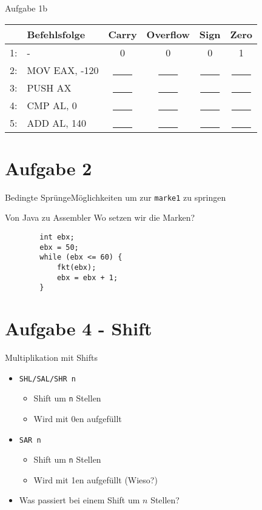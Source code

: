 \documentclass[
  german,            %
  aspectratio=169,    %
  sectionpage=false,   %
]{tumbeamer}
\begin{document}
\begin{frame}{Aufgabe 1b}
		\begin{center}
	\begin{tabular}{r l c c c c}
		& Befehlsfolge & Carry & Overflow & Sign & Zero\\ \hline
		1: & - & 0 & 0 & 0 & 1\\
		2: & MOV EAX, -120 & \underline{~~~~} & \underline{~~~~} & \underline{~~~~} & \underline{~~~~}\\
		3: & PUSH AX & \underline{~~~~} & \underline{~~~~} & \underline{~~~~} & \underline{~~~~}\\
		4: & CMP AL, 0 & \underline{~~~~} & \underline{~~~~} & \underline{~~~~} & \underline{~~~~}\\
		5: & ADD AL, 140 & \underline{~~~~} & \underline{~~~~} & \underline{~~~~} & \underline{~~~~}
	\end{tabular}
\end{center}
\end{frame}
\section{Aufgabe 2}
\begin{frame}{Bedingte Sprünge}{Möglichkeiten um zur \texttt{marke1} zu springen}
\end{frame}
\begin{frame}[fragile]{Von Java zu Assembler}
Wo setzen wir die Marken?
\newline
	\lstset{language=C}
	\begin{lstlisting}
		int ebx;
		ebx = 50;
		while (ebx <= 60) {
			fkt(ebx);
			ebx = ebx + 1;
		}
	\end{lstlisting}
\end{frame}
\section{Aufgabe 4 - Shift}
\begin{frame}{Multiplikation mit Shifts}
	\begin{itemize}
		\item \texttt{SHL/SAL/SHR n}
		\begin{itemize}
			\item Shift um \texttt{n} Stellen
			\item Wird mit 0en aufgefüllt
		\end{itemize}
		\item \texttt{SAR n}
		\begin{itemize}
			\item Shift um \texttt{n} Stellen
			\item Wird mit 1en aufgefüllt (Wieso?)
		\end{itemize}
		\item Was passiert bei einem Shift um $n$ Stellen?
	\end{itemize}
\end{frame}
\end{document}
